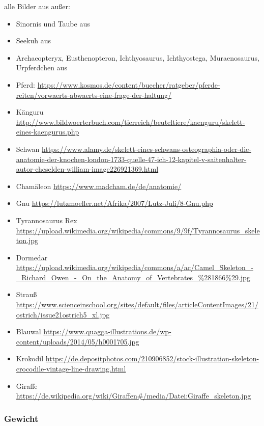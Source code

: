  alle Bilder aus \cite{Spezielle_Zoologie} außer:
 \begin{itemize}
  \item Sinornis und Taube aus \cite{Vergleichende_Anatomie}
  \item Seekuh aus \cite{Zoologie25Wehner}
  \item Archaeopteryx, Eusthenopteron, Ichthyosaurus, Ichthyostega, Muraenosaurus, Urpferdchen aus \cite{Zoologie24Wehner}
  \item Pferd: \url{https://www.kosmos.de/content/buecher/ratgeber/pferde-reiten/vorwaerts-abwaerts-eine-frage-der-haltung/}
  \item Känguru \url{http://www.bildwoerterbuch.com/tierreich/beuteltiere/kaenguru/skelett-eines-kaengurus.php}
  \item Schwan \url{https://www.alamy.de/skelett-eines-schwans-osteographia-oder-die-anatomie-der-knochen-london-1733-quelle-47-ich-12-kapitel-v-saitenhalter-autor-cheselden-william-image226921369.html}
  \item Chamäleon \url{https://www.madcham.de/de/anatomie/}
  \item Gnu \url{https://lutzmoeller.net/Afrika/2007/Lutz-Juli/8-Gnu.php}
  \item Tyrannosaurus Rex \url{https://upload.wikimedia.org/wikipedia/commons/9/9f/Tyrannosaurus_skeleton.jpg}
  \item Dormedar \url{https://upload.wikimedia.org/wikipedia/commons/a/ac/Camel_Skeleton_-_Richard_Owen_-_On_the_Anatomy_of_Vertebrates_\%281866\%29.jpg}
  \item Strauß \url{https://www.scienceinschool.org/sites/default/files/articleContentImages/21/ostrich/issue21ostrich5_xl.jpg}
  \item Blauwal \url{https://www.quagga-illustrations.de/wp-content/uploads/2014/05/h0001705.jpg}
  \item Krokodil \url{https://de.depositphotos.com/210906852/stock-illustration-skeleton-crocodile-vintage-line-drawing.html}
  \item Giraffe \url{https://de.wikipedia.org/wiki/Giraffen#/media/Datei:Giraffe_skeleton.jpg}
 \end{itemize}

 
 \subsubsection{Gewicht}
 
